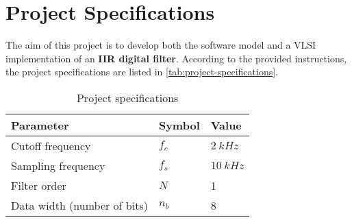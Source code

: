 \section{Project Specifications}
The aim of this project is to develop both the software model and a VLSI implementation of an \textbf{IIR digital filter}. According to the provided instructions, the project specifications are listed in \autoref{tab:project-specifications}.
\begin{table}[htbp]
	\center
	\begin{tabular}{|l l l|}
		\hline
        \textbf{Parameter} & \textbf{Symbol} & \textbf{Value} \\ \hline
        Cutoff frequency & $f_c$ & $\SI{2}{kHz}$ \\ \hline
        Sampling frequency & $f_s$ & $\SI{10}{kHz}$ \\ \hline
        Filter order & $N$ & 1 \\ \hline
        Data width (number of bits) & $n_b$ & 8 \\
		\hline
	\end{tabular}
	\caption{Project specifications}
	\label{tab:project-specifications}
\end{table}
